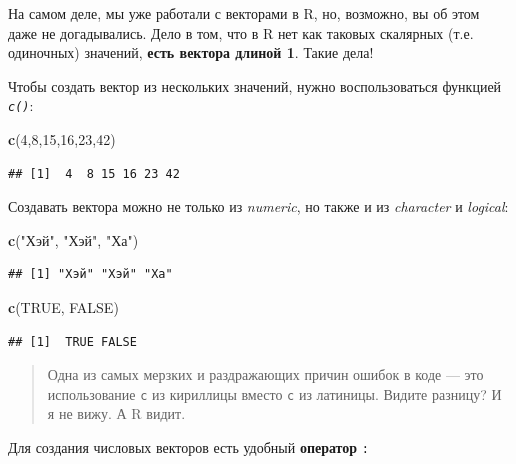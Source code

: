 \documentclass[]{book}
\newenvironment{Shaded}{\begin{snugshade}}{\end{snugshade}}
\newcommand{\KeywordTok}[1]{\textcolor[rgb]{0.13,0.29,0.53}{\textbf{#1}}}
\newcommand{\DecValTok}[1]{\textcolor[rgb]{0.00,0.00,0.81}{#1}}
\newcommand{\StringTok}[1]{\textcolor[rgb]{0.31,0.60,0.02}{#1}}
\newcommand{\OtherTok}[1]{\textcolor[rgb]{0.56,0.35,0.01}{#1}}
\newcommand{\NormalTok}[1]{#1}
\begin{document}
На самом деле, мы уже работали с векторами в R, но, возможно, вы об этом
даже не догадывались. Дело в том, что в R нет как таковых скалярных
(т.е. одиночных) значений, \textbf{есть вектора длиной 1}. Такие дела!

Чтобы создать вектор из нескольких значений, нужно воспользоваться
функцией \emph{\texttt{c()}}:

\begin{Shaded}
\begin{Highlighting}[]
\KeywordTok{c}\NormalTok{(}\DecValTok{4}\NormalTok{,}\DecValTok{8}\NormalTok{,}\DecValTok{15}\NormalTok{,}\DecValTok{16}\NormalTok{,}\DecValTok{23}\NormalTok{,}\DecValTok{42}\NormalTok{)}
\end{Highlighting}
\end{Shaded}

\begin{verbatim}
## [1]  4  8 15 16 23 42
\end{verbatim}

Создавать вектора можно не только из \emph{numeric}, но также и из
\emph{character} и \emph{logical}:

\begin{Shaded}
\begin{Highlighting}[]
\KeywordTok{c}\NormalTok{(}\StringTok{"Хэй"}\NormalTok{, }\StringTok{"Хэй"}\NormalTok{, }\StringTok{"Ха"}\NormalTok{)}
\end{Highlighting}
\end{Shaded}

\begin{verbatim}
## [1] "Хэй" "Хэй" "Ха"
\end{verbatim}

\begin{Shaded}
\begin{Highlighting}[]
\KeywordTok{c}\NormalTok{(}\OtherTok{TRUE}\NormalTok{, }\OtherTok{FALSE}\NormalTok{)}
\end{Highlighting}
\end{Shaded}

\begin{verbatim}
## [1]  TRUE FALSE
\end{verbatim}

\begin{quote}
Одна из самых мерзких и раздражающих причин ошибок в коде --- это
использование \texttt{с} из кириллицы вместо \texttt{c} из латиницы.
Видите разницу? И я не вижу. А R видит.
\end{quote}

Для создания числовых векторов есть удобный \textbf{оператор} \texttt{:}
\end{document}
